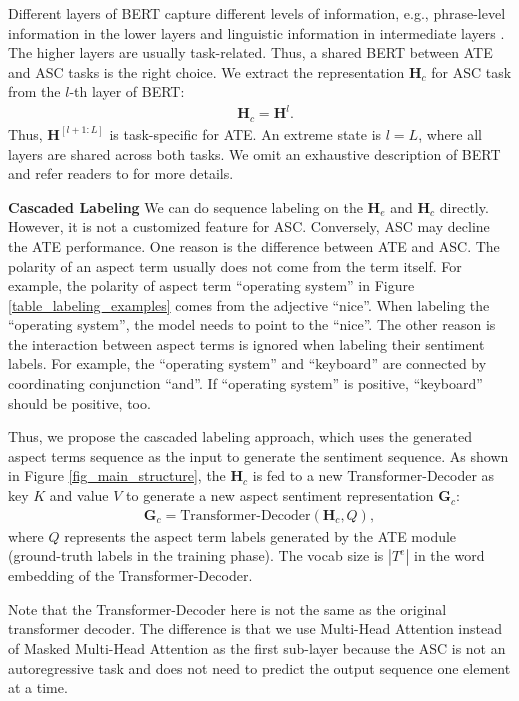 \documentclass[11pt,a4paper]{article}
\begin{document}
Different layers of BERT capture different levels of information, e.g., phrase-level information in the lower layers and linguistic information in intermediate layers \cite{Jawahar2019}. The higher layers are usually task-related. Thus, a shared BERT between ATE and ASC tasks is the right choice. We extract the representation $\mathbf{H}_{c}$ for ASC task from the $l$-th layer of BERT:
\begin{align}
	&\mathbf{H}_{c} = \mathbf{H}^{l}. \label{eq_bert_asc}
\end{align}
Thus, $\mathbf{H}^{[l+1:L]}$ is task-specific for ATE. An extreme state is $l=L$, where all layers are shared across both tasks. We omit an exhaustive description of BERT and refer readers to \citet{Devlin2019} for more details.

\noindent
\textbf{Cascaded Labeling}\quad
We can do sequence labeling on the $\mathbf{H}_{e}$ and $\mathbf{H}_{c}$ directly. However, it is not a customized feature for ASC. Conversely, ASC may decline the ATE performance. One reason is the difference between ATE and ASC. The polarity of an aspect term usually does not come from the term itself. For example, the polarity of aspect term ``operating system'' in Figure \ref{table_labeling_examples} comes from the adjective ``nice''. When labeling the ``operating system'', the model needs to point to the ``nice''. The other reason is the interaction between aspect terms is ignored when labeling their sentiment labels. For example, the ``operating system'' and ``keyboard'' are connected by coordinating conjunction ``and''. If ``operating system'' is positive, ``keyboard'' should be positive, too.

Thus, we propose the cascaded labeling approach, which uses the generated aspect terms sequence as the input to generate the sentiment sequence. As shown in Figure \ref{fig_main_structure}, the $\mathbf{H}_{c}$ is fed to a new Transformer-Decoder \cite{Vaswani2017} as key $K$ and value $V$ to generate a new aspect sentiment representation $\mathbf{G}_{c}$:
\begin{align}
	\mathbf{G}_{c} = \text{Transformer-Decoder}(\mathbf{H}_{c}, Q), \label{eq_grace_asc}
\end{align} 
where $Q$ represents the aspect term labels generated by the ATE module (ground-truth labels in the training phase). The vocab size is $|T^e|$ in the word embedding of the Transformer-Decoder. 

Note that the Transformer-Decoder here is not the same as the original transformer decoder. The difference is that we use Multi-Head Attention instead of Masked Multi-Head Attention as the first sub-layer because the ASC is not an autoregressive task and does not need to predict the output sequence one element at a time.
\end{document}
